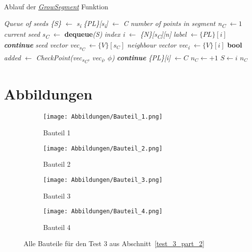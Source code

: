 \begin{algorithm}
	\caption{Ablauf der \textit{\hyperref[alg:grow_segment]{GrowSegment}} Funktion}
	\label{alg:grow_segment}
	\begin{algorithmic}[1]
		\State \textit{Queue of seeds \{S\}} $\gets$ \textit{s\textsubscript{i}}
		\State \textit{\{PL\}[s\textsubscript{i}]} $\gets$ \textit{C}
		\State \textit{number of points in segment n\textsubscript{C}} $\gets 1$
		\State \textit{current seed s\textsubscript{C}} $\gets$ \textbf{dequeue}\textit{(S)}
		\State \textit{index i} $\gets$ \textit{\{N\}[s\textsubscript{C}][n]}
		\State \textit{label} $\gets \{PL\}[i]$ 
		\State \textit{\textbf{continue}}
		\EndIf
		\State \textit{seed vector vec\textsubscript{s\textsubscript{C}}} $\gets \{V\}[s_C]$
		\State \textit{neighbour vector vec\textsubscript{i}} $\gets \{V\}[i]$
		\State \textbf{bool }\textit{added} $\gets$ \textit{CheckPoint(vec\textsubscript{s\textsubscript{C}}, vec\textsubscript{i}, $\phi$)}
		\State \textit{\textbf{continue}}
		\EndIf
		\State \textit{\{PL\}[i]} $\gets C$
		\State $n_C \gets +1$
		\State $S \gets i$
		\EndFor
		\EndWhile
		\State \Return $n_C$
		\EndFunction
	\end{algorithmic}
\end{algorithm}

\chapter{Abbildungen} \label{Bilder}
\begin{figure}[h]
	\centering
	\begin{subfigure}{0.49\textwidth}
		\texttt{[image: Abbildungen/Bauteil\_1.png]}
		\centering
		\caption{Bauteil 1}
		\label{fig:bauteil_1}
	\end{subfigure}
	\hfill
	\begin{subfigure}{0.49\textwidth}
		\texttt{[image: Abbildungen/Bauteil\_2.png]}
		\centering
		\caption{Bauteil 2}
		\label{fig:bauteil_2}
	\end{subfigure}
	\vfill
		\begin{subfigure}{0.49\textwidth}
		\texttt{[image: Abbildungen/Bauteil\_3.png]}
		\centering
		\caption{Bauteil 3}
		\label{fig:bauteil_3}
	\end{subfigure}
	\hfill
	\begin{subfigure}{0.49\textwidth}
		\texttt{[image: Abbildungen/Bauteil\_4.png]}
		\centering
		\caption{Bauteil 4}
		\label{fig:bauteil_4}
	\end{subfigure}
\caption{Alle Bauteile für den Test 3 aus Abschnitt~\ref{test_3_part_2}}
\label{fig:bauteile_test_3_2}
\end{figure}


